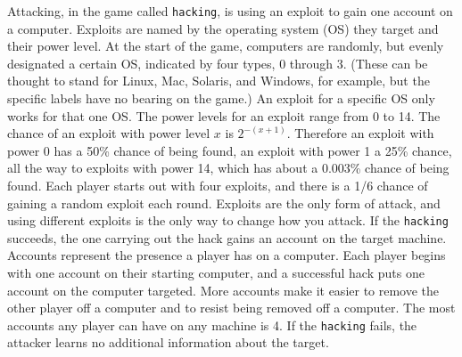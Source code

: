 Attacking, in the game called {\tt hacking}, is using an exploit to gain one account on a computer. Exploits are named by the operating system (OS) they target and their power level.  At the start of the game, computers are randomly, but evenly designated a certain OS, indicated by four types, 0 through 3. (These can be thought to stand for Linux, Mac, Solaris, and Windows, for example, but the specific labels have no bearing on the game.) An exploit for a specific OS only works for that one OS.  The power levels for an exploit range from 0 to 14. The chance of an exploit with power level $x$ is $2^{-(x+1)}$. Therefore an exploit with power 0 has a 50\% chance of being found, an exploit with power 1 a 25\% chance, all the way to exploits with power 14, which has about a 0.003\% chance of being found. Each player starts out with four exploits, and there is a 1/6 chance of gaining a random exploit each round. Exploits are the only form of attack, and using different exploits is the only way to change how you attack. If the {\tt hacking} succeeds, the one carrying out the hack gains an account on the target machine.  Accounts represent the presence a player has on a computer. Each player begins with one account on their starting computer, and a successful hack puts one account on the computer targeted.  More accounts make it easier to remove the other player off a computer and to resist being removed off a computer. The most accounts any player can have on any machine is 4. If the {\tt hacking} fails, the attacker learns no additional information about the target. 

